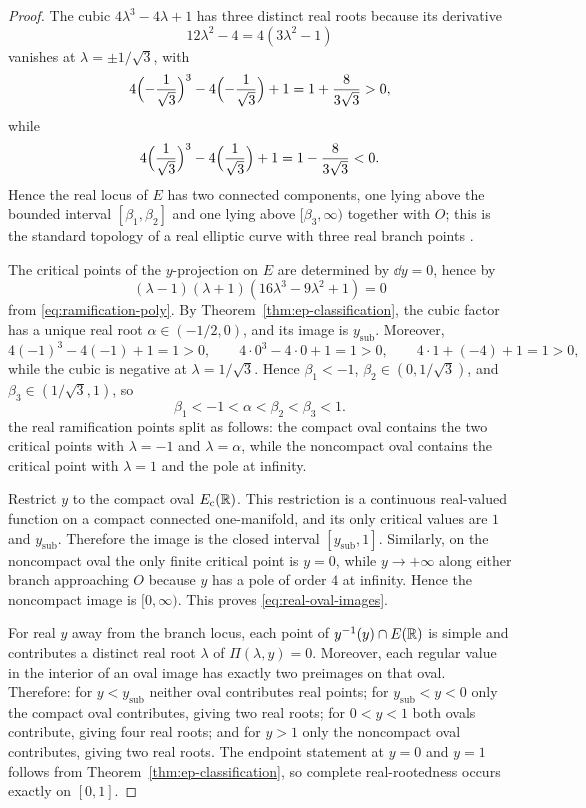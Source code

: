 \begin{proof}
The cubic $4\lambda^3-4\lambda+1$ has three distinct real roots because its derivative
\[
12\lambda^2-4=4(3\lambda^2-1)
\]
vanishes at $\lambda=\pm 1/\sqrt{3}$, with
\[
4\Bigl(-\frac{1}{\sqrt{3}}\Bigr)^3-4\Bigl(-\frac{1}{\sqrt{3}}\Bigr)+1
=1+\frac{8}{3\sqrt{3}}>0,
\]
while
\[
4\Bigl(\frac{1}{\sqrt{3}}\Bigr)^3-4\Bigl(\frac{1}{\sqrt{3}}\Bigr)+1
=1-\frac{8}{3\sqrt{3}}<0.
\]
Hence the real locus of $E$ has two connected components, one lying above the bounded interval $[\beta_1,\beta_2]$ and one lying above $[\beta_3,\infty)$ together with $O$; this is the standard topology of a real elliptic curve with three real branch points \cite{Silverman2009,Miranda1995}.

The critical points of the \(y\)-projection on $E$ are determined by $\dd y=0$, hence by
\[
(\lambda-1)(\lambda+1)(16\lambda^3-9\lambda^2+1)=0
\]
from \eqref{eq:ramification-poly}.
By Theorem~\ref{thm:ep-classification}, the cubic factor has a unique real root $\alpha\in(-1/2,0)$, and its image is $y_{\mathrm{sub}}$.
Moreover,
\[
4(-1)^3-4(-1)+1=1>0,
\qquad
4\cdot 0^3-4\cdot 0+1=1>0,
\qquad
4\cdot 1+(-4)+1=1>0,
\]
while the cubic is negative at $\lambda=1/\sqrt3$.
Hence $\beta_1<-1$, $\beta_2\in(0,1/\sqrt3)$, and $\beta_3\in(1/\sqrt3,1)$, so
\[
\beta_1<-1<\alpha<\beta_2<\beta_3<1.
\]
the real ramification points split as follows:
the compact oval contains the two critical points with $\lambda=-1$ and $\lambda=\alpha$, while the noncompact oval contains the critical point with $\lambda=1$ and the pole at infinity.

Restrict $y$ to the compact oval $E_{\mathrm{c}}(\mathbb{R})$.
This restriction is a continuous real-valued function on a compact connected one-manifold, and its only critical values are $1$ and $y_{\mathrm{sub}}$.
Therefore the image is the closed interval $[y_{\mathrm{sub}},1]$.
Similarly, on the noncompact oval the only finite critical point is $y=0$, while $y\to+\infty$ along either branch approaching $O$ because $y$ has a pole of order $4$ at infinity.
Hence the noncompact image is $[0,\infty)$.
This proves \eqref{eq:real-oval-images}.

For real $y$ away from the branch locus, each point of $y^{-1}(y)\cap E(\mathbb{R})$ is simple and contributes a distinct real root $\lambda$ of $\Pi(\lambda,y)=0$.
Moreover, each regular value in the interior of an oval image has exactly two preimages on that oval.
Therefore:
for $y<y_{\mathrm{sub}}$ neither oval contributes real points;
for $y_{\mathrm{sub}}<y<0$ only the compact oval contributes, giving two real roots;
for $0<y<1$ both ovals contribute, giving four real roots;
and for $y>1$ only the noncompact oval contributes, giving two real roots.
The endpoint statement at $y=0$ and $y=1$ follows from Theorem~\ref{thm:ep-classification}, so complete real-rootedness occurs exactly on $[0,1]$.
\end{proof}
